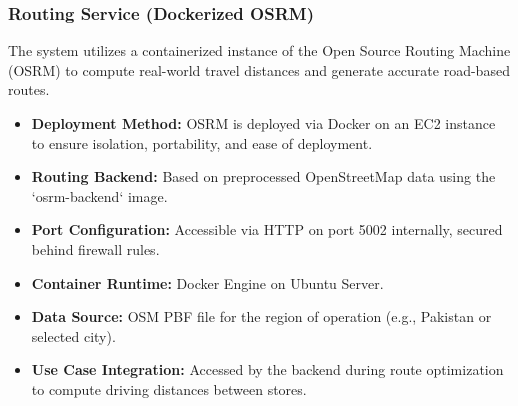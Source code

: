 \subsubsection{Routing Service (Dockerized OSRM)}
The system utilizes a containerized instance of the Open Source Routing Machine (OSRM) to compute real-world travel distances and generate accurate road-based routes.

\begin{itemize}
    \item \textbf{Deployment Method:} OSRM is deployed via Docker on an EC2 instance to ensure isolation, portability, and ease of deployment.
    \item \textbf{Routing Backend:} Based on preprocessed OpenStreetMap data using the `osrm-backend` image.
    \item \textbf{Port Configuration:} Accessible via HTTP on port 5002 internally, secured behind firewall rules.
    \item \textbf{Container Runtime:} Docker Engine on Ubuntu Server.
    \item \textbf{Data Source:} OSM PBF file for the region of operation (e.g., Pakistan or selected city).
    \item \textbf{Use Case Integration:} Accessed by the backend during route optimization to compute driving distances between stores.
\end{itemize}



